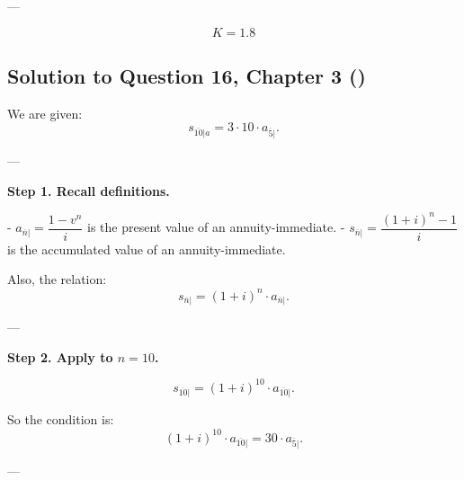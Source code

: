 \documentclass[12pt, a4paper]{article}
\begin{document}
---

\[
\boxed{K = 1.8}
\]

\subsection*{Solution to Question 16, Chapter 3 (\cite{toi3rd})}

We are given:
\[
s_{\overline{10}|a} = 3 \cdot 10 \cdot a_{\overline{5}|}.
\]

---

\textbf{Step 1. Recall definitions.}

- $a_{\overline{n}|} = \dfrac{1-v^n}{i}$ is the present value of an annuity-immediate.  
- $s_{\overline{n}|} = \dfrac{(1+i)^n - 1}{i}$ is the accumulated value of an annuity-immediate.  

Also, the relation:
\[
s_{\overline{n}|} = (1+i)^n \cdot a_{\overline{n}|}.
\]

---

\textbf{Step 2. Apply to $n=10$.}

\[
s_{\overline{10}|} = (1+i)^{10} \cdot a_{\overline{10}|}.
\]

So the condition is:
\[
(1+i)^{10} \cdot a_{\overline{10}|} = 30 \cdot a_{\overline{5}|}.
\]

---
\end{document}
